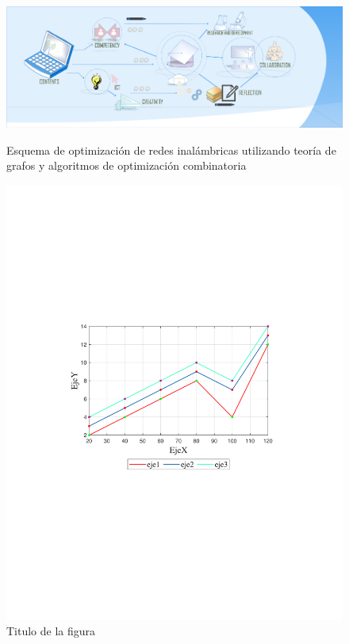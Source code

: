 \documentclass[12pt,a4paper]{article}
\begin{document}
\begin{figure}[ht!]
\centering
{\includegraphics[clip=true,trim= 0cm 0cm 0cm 0cm, width=16cm]{Figuras/figure1.pdf}}
\caption{Esquema de optimización de redes inalámbricas utilizando teoría de grafos y algoritmos de optimización combinatoria}
\label{fig:0}
\end{figure}

\begin{figure}[H]
\includegraphics[clip=true,trim= 0cm 0cm 0cm 0cm,width=20cm]{Figuras/figureB.pdf}
\caption{Titulo de la figura}
\label{figB}
\end{figure}
\end{document}
